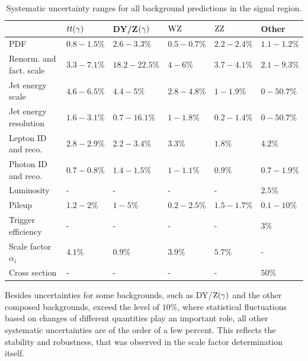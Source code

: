 \begin{table}[tbp]
 \centering
 \caption{Systematic uncertainty ranges for all background predictions in the signal region.}
 \small
 \label{tab:systuncBKG}
 \begin{tabular}[width=\textwidth]{llllll}
                            & $tt(\gamma)$  & DY/Z$(\gamma)$  & $\mathrm{W}\mathrm{Z}$    & $\mathrm{Z}\mathrm{Z}$    & Other       \\\hline
  PDF                       & $0.8-1.5\%$ & $2.6-3.3\%$   & $0.5-0.7\%$ & $2.2-2.4\%$ & $1.1-1.2\%$ \\
  Renorm. and fact. scale   & $3.3-7.1\%$ & $18.2-22.5\%$ & $4-6\%$     & $3.7-4.1\%$ & $2.1-9.3\%$ \\
  Jet energy scale          & $4.6-6.5\%$ & $4.4-5\%$     & $2.8-4.8\%$ & $1-1.9\%$   & $0-50.7\%$  \\
  Jet energy resolution     & $1.6-3.1\%$ & $0.7-16.1\%$  & $1-1.8\%$   & $0.2-1.4\%$ & $0-50.7\%$  \\
  Lepton ID and reco.       & $2.8-2.9\%$ & $2.2-3.4\%$   & $3.3\%$     & $1.8\%$     & $4.2\%$     \\
  Photon ID and reco.       & $0.7-0.8\%$ & $1.4-1.5\%$   & $1-1.1\%$   & $0.9\%$     & $0.7-1.9\%$ \\
  Luminosity                & -           & -             & -           & -           & $2.5\%$     \\
  Pileup                    & $1.2-2\%$   & $1-5\%$       & $0.2-2.5\%$ & $1.5-1.7\%$ & $0.1-10\%$  \\
  Trigger efficiency        & -           & -             & -           & -           & $3\%$       \\
  Scale factor $\alpha_{i}$ & $4.1\%$     & $0.9\%$       & $3.9\%$     & $5.7\%$     & -           \\
  Cross section             & -           & -             & -           & -           & $50\%$      \\
  \hline
 \end{tabular}
\end{table}
Besides uncertainties for some backgrounds, such as DY/$\mathrm{Z}(\gamma)$ and the other composed backgrounds, exceed the level of $10\%$, where statistical fluctuations based on changes of different quantities play an important role, all other systematic uncertainties are of the order of a few percent. This reflects the stability and robustness, that was observed in the scale factor determination itself.


